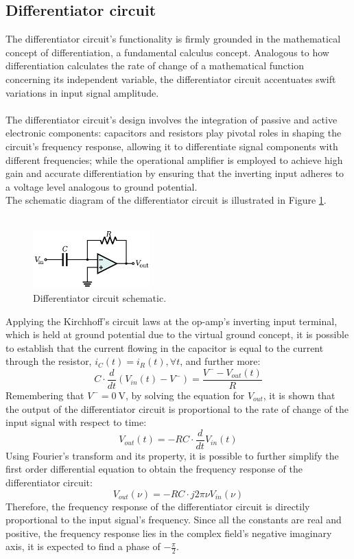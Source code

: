 	\subsection{Differentiator circuit}
		The differentiator circuit's functionality is firmly grounded in the mathematical concept of differentiation, a fundamental calculus concept.
		Analogous to how differentiation calculates the rate of change of a mathematical function concerning its independent variable, 
		the differentiator circuit accentuates swift variations in input signal amplitude. \\\\
		The differentiator circuit's design involves the integration of passive and active electronic components:
		capacitors and resistors play pivotal roles in shaping the circuit's frequency response, allowing it to differentiate signal components with different frequencies; 
		while the operational amplifier is employed to achieve high gain and accurate differentiation by ensuring that the inverting input adheres to a voltage level analogous to ground potential. \\
		The schematic diagram of the differentiator circuit is illustrated in Figure \ref{fig:differentiator_circuit}. \\\\
		\begin{figure}[H]
		    \centering
		    \includegraphics[width=0.4\textwidth]{figures/differentiator/circuit.png}
		    \caption{Differentiator circuit schematic.}
		    \label{fig:differentiator_circuit}
		\end{figure}
		\noindent 
		Applying the Kirchhoff's circuit laws at the op-amp's inverting input terminal, which is held at ground potential due to the virtual ground concept, 
		it is possible to establish that the current flowing in the capacitor is equal to the current through the resistor, $i_C(t) = i_R(t), \forall t$, and further more: 
		$$ C \cdot \frac{d}{dt}(V_{in}(t) - V^-) = \frac{V^- - V_{out}(t)}{R} $$
		Remembering that $V^- = \SI{0}{\volt}$, by solving the equation for $V_{out}$, 
		it is shown that the output of the differentiator circuit is proportional to the rate of change of the input signal with respect to time: $$ V_{out}(t) = - RC \cdot \frac{d}{dt}V_{in}(t) $$
		Using Fourier's transform and its property, it is possible to further simplify the first order differential equation to obtain the frequency response of the differentiator circuit: 
		$$ V_{out}(\nu) = - RC \cdot j 2 \pi \nu V_{in}(\nu) $$
		\noindent
		Therefore, the frequency response of the differentiator circuit is directily proportional to the input signal's frequency.
		Since all the constants are real and positive, the frequency response lies in the complex field's negative imaginary axis, it is expected to find a phase of $-\frac{\pi}{2}$.
		
